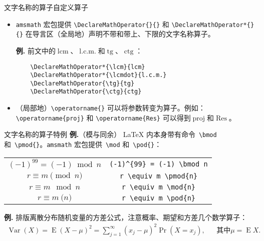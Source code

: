 \documentclass[mathserif]{beamer}
\newcommand{\codegreen}[1]{\textcolor{codegreen}{#1}}
\DeclareMathOperator{\tg}{tg}
\DeclareMathOperator{\ctg}{ctg}
\newenvironment{instance}{\zihao{-5}\textbf{\songti \codegreen{例.}}}{\hfill\par}
\begin{document}
\begin{frame}[fragile]{文字名称的算子}{自定义算子}
\begin{itemize}

\item \verb^amsmath^ 宏包提供 \lstinline'\DeclareMathOperator{}{}' 和 \lstinline'\DeclareMathOperator*{}{}' 在导言区（全局地）声明不带和带上、下限的文字名称算子。

\begin{instance}
前文中的$\operatorname{lcm}$、$\operatorname{l.c.m.}$和$\operatorname{tg}$、$\operatorname{ctg}$：
\begin{lstlisting}
	\DeclareMathOperator*{\lcm}{lcm}
	\DeclareMathOperator*{\lcmdot}{l.c.m.}
	\DeclareMathOperator{\tg}{tg}
	\DeclareMathOperator{\ctg}{ctg}
\end{lstlisting}
\end{instance}

\item （局部地）\lstinline'\operatorname{}' 可以将参数转变为算子。例如：\lstinline'\operatorname{proj}' 和 \lstinline'\operatorname{Res}' 可以得到$\operatorname{proj}$和$\operatorname{Res}$。

\end{itemize}
\end{frame}

\begin{frame}[fragile]{文字名称的算子}{特例}
\begin{instance}（模与同余）
	\LaTeX{} 内本身带有命令\ {\rm\lstinline'\bmod'} 和\ {\rm\lstinline'\pmod{}'}。\verb^amsmath^ 宏包提供\ {\rm\lstinline'\mod'} 和\ {\rm\lstinline'\pod{}'}：
\begin{table}[H]
\centering
\begin{tabular}{cc}
	\toprule
	$(-1)^{99} = (-1) \bmod n$ & \rm\lstinline'(-1)^{99} = (-1) \bmod n' \\
	$r \equiv m \pmod{n}$ & \rm\lstinline'r \equiv m \pmod{n}' \\
	$r \equiv m \mod{n}$ & \rm\lstinline'r \equiv m \mod{n}' \\
	$r \equiv m \pod{n}$ & \rm\lstinline'r \equiv m \pod{n}' \\
	\bottomrule
\end{tabular}
\end{table}
\end{instance}
\begin{instance}
	排版离散分布随机变量的方差公式，注意概率、期望和方差几个数学算子：\cite{LaTeX入门}
\begin{equation*}
	\begin{aligned}
	\operatorname{Var} \left( X \right) = \operatorname{E} (X - \mu)^{2} = \sum_{j=1}^{\infty} (x_{j} - \mu)^{2} \Pr(X = x_{j}), &&
	\text{其中$\mu = \operatorname{E} X$.}
	\end{aligned}
\end{equation*}
\end{instance}
\end{frame}
\end{document}

